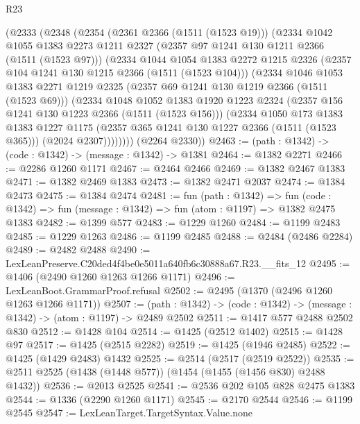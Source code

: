 \begin{lexlean}{R23}
\begin{coremodule}
    (@2333
      (@2348
        (@2354
          (@2361 @2366 (@1511 (@1523 @19)))
          (@2334
            @1042
            @1055
            @1383
            @2273
            @1211
            @2327
            (@2357 @97 @1241 @130 @1211 @2366 (@1511 (@1523 @97)))
            (@2334
              @1044
              @1054
              @1383
              @2272
              @1215
              @2326
              (@2357 @104 @1241 @130 @1215 @2366 (@1511 (@1523 @104)))
              (@2334
                @1046
                @1053
                @1383
                @2271
                @1219
                @2325
                (@2357 @69 @1241 @130 @1219 @2366 (@1511 (@1523 @69)))
                (@2334
                  @1048
                  @1052
                  @1383
                  @1920
                  @1223
                  @2324
                  (@2357 @156 @1241 @130 @1223 @2366 (@1511 (@1523 @156)))
                  (@2334
                    @1050
                    @173
                    @1383
                    @1383
                    @1227
                    @1175
                    (@2357 @365 @1241 @130 @1227 @2366 (@1511 (@1523 @365)))
                    (@2024 @2307))))))))
      (@2264 @2330))
@2463 := (path : @1342) -> (code : @1342) -> (message : @1342) -> @1381
@2464 := @1382 @2271
@2466 := @2286 @1260 @1171
@2467 := @2464 @2466
@2469 := @1382 @2467 @1383
@2471 := @1382 @2469 @1383
@2473 := @1382 @2471 @2037
@2474 := @1384 @2473
@2475 := @1384 @2474
@2481 := fun (path : @1342) =>
  fun (code : @1342) => fun (message : @1342) => fun (atom : @1197) => @1382 @2475 @1383
@2482 := @1399 @577
@2483 := @1229 @1260
@2484 := @1199 @2483
@2485 := @1229 @1263
@2486 := @1199 @2485
@2488 := @2484 (@2486 @2284)
@2489 := @2482 @2488
@2490 := LexLeanPreserve.C20ded4f4be0e5011a640fb6c30888a67.R23.__fits_12
@2495 := @1406 (@2490 @1260 @1263 @1266 @1171)
@2496 := LexLeanBoot.GrammarProof.refusal
@2502 := @2495 (@1370 (@2496 @1260 @1263 @1266 @1171))
@2507 := (path : @1342) -> (code : @1342) -> (message : @1342) -> (atom : @1197) -> @2489 @2502
@2511 := @1417 @577 @2488 @2502 @830
@2512 := @1428 @104
@2514 := @1425 (@2512 @1402)
@2515 := @1428 @97
@2517 := @1425 (@2515 @2282)
@2519 := @1425 (@1946 @2485)
@2522 := @1425 (@1429 @2483) @1432
@2525 := @2514 (@2517 (@2519 @2522))
@2535 := @2511 @2525 (@1438 (@1448 @577)) (@1454 (@1455 (@1456 @830) @2488 @1432))
@2536 := @2013 @2525
@2541 := @2536 @202 @105 @828 @2475 @1383
@2544 := @1336 (@2290 @1260 @1171)
@2545 := @2170 @2544
@2546 := @1199 @2545
@2547 := LexLeanTarget.TargetSyntax.Value.none

\end{coremodule}
\end{lexlean}

